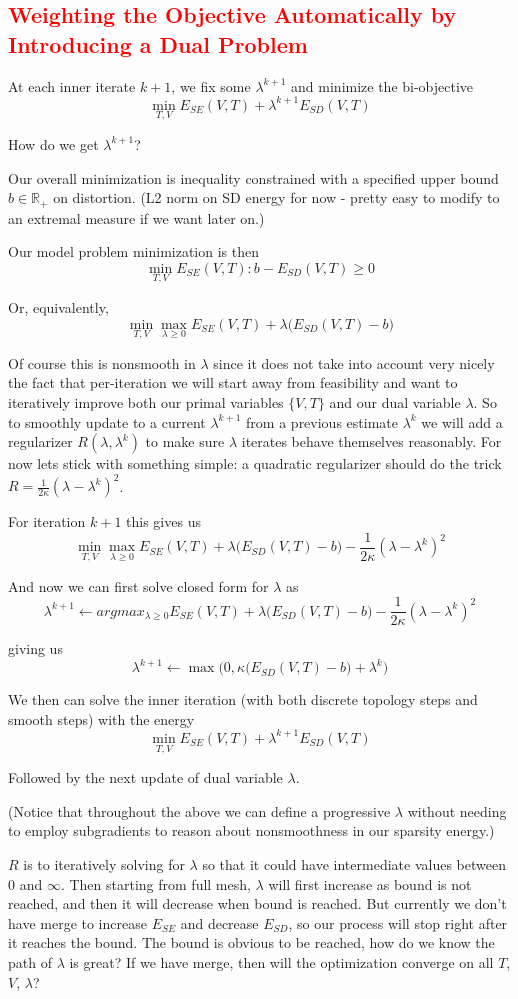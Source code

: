\textcolor{red}{\section{Weighting the Objective Automatically by Introducing a Dual Problem}}

At each inner iterate $k+1$, we fix some $\lambda^{k+1}$ and minimize the bi-objective 
\[ \min_{T,V} E_{SE}(V,T) + \lambda^{k+1} E_{SD}(V,T) \]

How do we get $\lambda^{k+1}$? 

Our overall minimization is inequality constrained with a specified upper bound $b \in \mathbb{R}_+$ on distortion. (L2 norm on SD  energy for now - pretty easy to modify to an extremal measure if we want later on.)

Our model problem minimization is then 
\[ \min_{T,V} E_{SE}(V,T) :  b - E_{SD}(V,T) \geq 0 \]

Or, equivalently,
\[ \min_{T,V} \max_{\lambda \geq 0} E_{SE}(V,T) + \lambda \big( E_{SD}(V,T) - b\big) \]

Of course this is nonsmooth in $\lambda$ since it does not take into account very nicely the fact that per-iteration we will start away from feasibility and want to iteratively improve both our primal variables $\{V,T\}$ and our dual variable $\lambda$.  So to smoothly update to a current $\lambda^{k+1}$ from a previous estimate $\lambda^k$ we will add a regularizer $R(\lambda,\lambda^k)$ to make sure $\lambda$ iterates behave themselves reasonably. For now lets stick with something simple: a quadratic regularizer should do the trick  $R =\frac{1}{2\kappa} (\lambda- \lambda^k)^2$. 

For iteration $k+1$ this gives us 
\[ \min_{T,V} \max_{\lambda \geq 0} E_{SE}(V,T) + \lambda \big( E_{SD}(V,T) - b\big) - \frac{1}{2\kappa} (\lambda- \lambda^k)^2 \]

And now we can first solve closed form for $\lambda$ as 
\[ \lambda^{k+1} \leftarrow argmax_{\lambda \geq 0} E_{SE}(V,T) + \lambda \big( E_{SD}(V,T) - b\big) - \frac{1}{2\kappa} (\lambda- \lambda^k)^2 \]

giving us 
\[ \lambda^{k+1} \leftarrow \max\big(0,\kappa \big( E_{SD}(V,T) -b \big) + \lambda^k\big) \]

We then can solve the inner iteration (with both discrete topology steps and smooth steps) with the energy 
\[ \min_{T,V}  E_{SE}(V,T) + \lambda^{k+1}  E_{SD}(V,T) \]

Followed by the next update of dual variable $\lambda$.

(Notice that throughout the above we can define a progressive $\lambda$ without needing to employ subgradients to reason about nonsmoothness in our sparsity energy.)

$R$ is to iteratively solving for $\lambda$ so that it could have intermediate values between $0$ and $\infty$. Then starting from full mesh, $\lambda$ will first increase as bound is not reached, and then it will decrease when bound is reached. But currently we don't have merge to increase $E_{SE}$ and decrease $E_{SD}$, so our process will stop right after it reaches the bound. The bound is obvious to be reached, how do we know the path of $\lambda$ is great? If we have merge, then will the optimization converge on all $T$, $V$, $\lambda$?